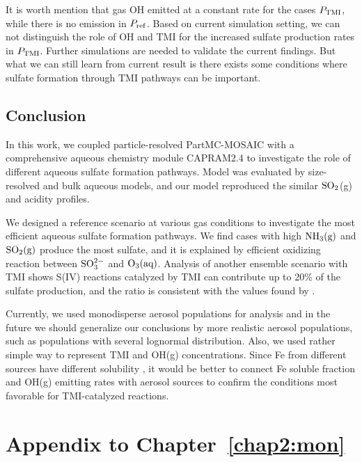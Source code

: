 \documentclass[edeposit,fullpage]{uiucthesis2009}
\begin{document}
It is worth mention that gas OH emitted at a constant rate for the cases $P_{\rm TMI}$, while there is no emission in $P_{\rm ref}$. Based on current simulation setting, we can not distinguish the role of OH and TMI for the increased sulfate production rates in $P_{\rm TMI}$. Further simulations are needed to validate the current findings. But what we can still learn from current result is there exists some conditions where sulfate formation through TMI pathways can be important. 

\section{Conclusion}
In this work, we coupled particle-resolved PartMC-MOSAIC with a comprehensive aqueous chemistry 
module CAPRAM2.4 to investigate the role of different aqueous sulfate formation pathways. 
Model was evaluated by size-resolved and bulk aqueous models, and our model reproduced the similar $\rm SO_2$(g) and 
acidity profiles. 

We designed a reference scenario at various gas conditions to investigate the most efficient aqueous sulfate formation pathways.
We find cases with high $\rm NH_3(g)$ and $\rm SO_2(g)$ produce the most sulfate, and it is explained by efficient oxidizing reaction between $\rm SO_3^{2-}$ and $\rm O_3(aq)$. Analysis of another ensemble scenario with TMI shows S(IV) reactions catalyzed by TMI can contribute up to 20\% of the sulfate production, and the ratio is consistent with the values found by \citet{alexander2009transition}. 

Currently, we used monodisperse aerosol populations for analysis and in the future we should generalize our conclusions by more realistic aerosol populations, such as populations with several lognormal distribution. Also, we used rather simple way to represent TMI and OH(g) concentrations. Since Fe from different sources have different solubility \citep{desboeufs2005dissolution}, it would be better to connect Fe soluble fraction and OH(g) emitting rates with aerosol sources to confirm the conditions most favorable for TMI-catalyzed reactions. 

\appendix
\setcounter{algorithm}{0}

\chapter{Appendix to Chapter~\ref{chap2:mon}}
\label{tab:capram}
\end{document}

